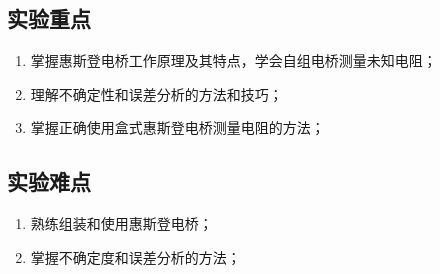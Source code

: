 \documentclass[]{../template/Report}%
\begin{document}
\subsection{实验重点}
\begin{enumerate}[label=(\arabic*),leftmargin=3em]
    \item 掌握惠斯登电桥工作原理及其特点，学会自组电桥测量未知电阻；
    \item 理解不确定性和误差分析的方法和技巧；
    \item 掌握正确使用盒式惠斯登电桥测量电阻的方法；
\end{enumerate}
\subsection{实验难点}
\begin{enumerate}[label=(\arabic*),leftmargin=3em]
    \item 熟练组装和使用惠斯登电桥；
    \item 掌握不确定度和误差分析的方法；
\end{enumerate}
\end{document}
